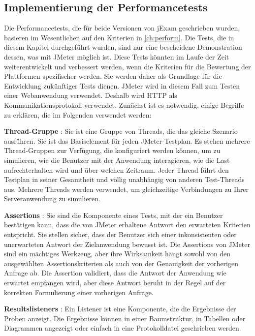 \subsection{Implementierung der Performancetests}

Die Performancetests, die für beide Versionen von jExam geschrieben wurden,
basieren im Wesentlichen auf den Kriterien in  \autoref{ch:perform}. Die Tests, die
in diesem Kapitel durchgeführt wurden, sind nur eine bescheidene Demonstration
dessen, was mit JMeter möglich ist. Diese Tests könnten im Laufe der Zeit
weiterentwickelt und verbessert werden, wenn die Kriterien für die Bewertung
der Plattformen spezifischer werden. Sie werden daher als Grundlage für die
Entwicklung zukünftiger Tests dienen. JMeter wird in diesem Fall zum Testen
einer Webanwendung verwendet. Deshalb wird HTTP als Kommunikationsprotokoll
verwendet. Zunächst ist es notwendig, einige Begriffe zu erklären, die im
Folgenden verwendet werden:

\textbf{Thread-Gruppe} : Sie ist eine Gruppe von Threads, die das gleiche
Szenario ausführen. Sie ist das Basiselement für jeden JMeter-Testplan. Es
stehen mehrere Thread-Gruppen zur Verfügung, die konfiguriert werden können,
um zu simulieren, wie die Benutzer mit der Anwendung interagieren, wie die
Last aufrechterhalten wird und über welchen Zeitraum. Jeder Thread führt
den Testplan in seiner Gesamtheit und völlig unabhängig von anderen
Test-Threads aus. Mehrere Threads werden verwendet, um gleichzeitige
Verbindungen zu Ihrer Serveranwendung zu simulieren.

\textbf{Assertions} : Sie sind die Komponente eines Tests, mit der ein
Benutzer bestätigen kann, dass die von JMeter erhaltene Antwort den
erwarteten Kriterien entspricht. Sie stellen sicher, dass der Benutzer sich
einer inkonsistenten oder unerwarteten Antwort der Zielanwendung bewusst
ist. Die Assertions von JMeter sind ein mächtiges Werkzeug, aber ihre
Wirksamkeit hängt sowohl von den ausgewählten Assertionskriterien als auch
von der Genauigkeit der vorherigen Anfrage ab. Die Assertion validiert, dass
die Antwort der Anwendung wie erwartet empfangen wird, aber diese Antwort
beruht in der Regel auf der korrekten Formulierung einer vorherigen Anfrage.


\textbf{Resultslisteners} : Ein Listener ist eine Komponente, die die
Ergebnisse der Proben anzeigt. Die Ergebnisse können in einer Baumstruktur,
in Tabellen oder Diagrammen angezeigt oder einfach in eine Protokolldatei
geschrieben werden.


